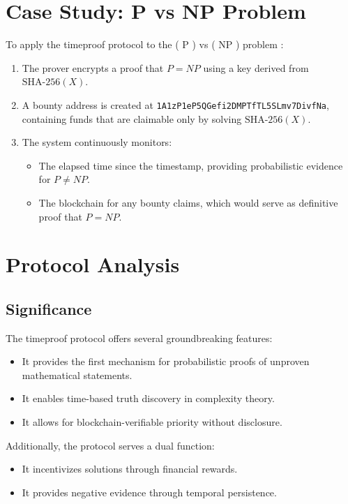 \documentclass[12pt]{report}
\begin{document}
\section{Case Study: P vs NP Problem}

To apply the timeproof protocol to the ( P ) vs ( NP ) problem \cite{Cook1971,Karp1972}:

\begin{enumerate}
    \item The prover encrypts a proof that \( P = NP \) using a key derived from \( \text{SHA-256}(X) \).
    \item A bounty address is created at \texttt{1A1zP1eP5QGefi2DMPTfTL5SLmv7DivfNa}, containing funds that are claimable only by solving \( \text{SHA-256}(X) \).
    \item The system continuously monitors:
    \begin{itemize}
        \item The elapsed time since the timestamp, providing probabilistic evidence for \( P \neq NP \).
        \item The blockchain for any bounty claims, which would serve as definitive proof that \( P = NP \).
    \end{itemize}
\end{enumerate}

\section{Protocol Analysis}
\subsection{Significance}

The timeproof protocol offers several groundbreaking features:

\begin{itemize}
    \item It provides the first mechanism for probabilistic proofs of unproven mathematical statements.
    \item It enables time-based truth discovery in complexity theory.
    \item It allows for blockchain-verifiable priority without disclosure.
\end{itemize}

Additionally, the protocol serves a dual function:

\begin{itemize}
    \item It incentivizes solutions through financial rewards.
    \item It provides negative evidence through temporal persistence.
\end{itemize}
\end{document}
